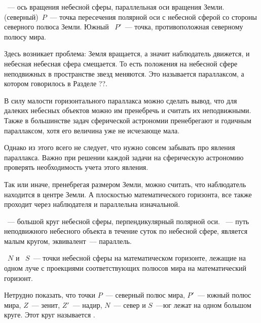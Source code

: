 ~--- ось вращения небесной сферы, параллельная оси вращения Земли.  (северный)~$P$~--- точка пересечения полярной оси с небесной сферой со стороны северного полюса Земли. Южный ~$P'$~--- точка, противоположная северному полюсу мира.

Здесь возникает проблема: Земля вращается, а значит наблюдатель движется, и небесная небесная сфера смещается. То есть положения на небесной сфере неподвижных в пространстве звезд меняются. Это называется параллаксом, а котором говорилось в Разделе ??. 

В силу малости горизонтального параллакса можно сделать вывод, что для далеких небесных объектов можно им пренебречь и считать их неподвижными. Также в большинстве задач сферической астрономии пренебрегают и годичным параллаксом, хотя его величина уже не исчезающе мала. 

Однако из этого всего не следует, что нужно совсем забывать про явления параллакса. Важно при решении каждой задачи на сферическую астрономию проверять необходимость учета этого явления.
	
Так или иначе, пренебрегая размером Земли, можно считать, что наблюдатель находится в центре Земли. А плоскостью математического горизонта, все также проходит через наблюдателя и параллельна изначальной.

~--- большой круг небесной сферы, перпендикулярный полярной оси. ~--- путь неподвижного небесного объекта в течение суток по небесной сфере, является малым кругом, эквивалент~--- параллель.

~$N$ и ~$S$~--- точки небесной сферы на математическом горизонте, лежащие на одном луче с проекциями соответствующих полюсов мира на математический горизонт.

Нетрудно показать, что точки $P$~--- северный полюс мира, $P'$~--- южный полюс мира, $Z$~--- зенит, $Z'$~--- надир, $N$~--- север и $S$~---юг лежат на одном большом круге. Этот круг называется .








